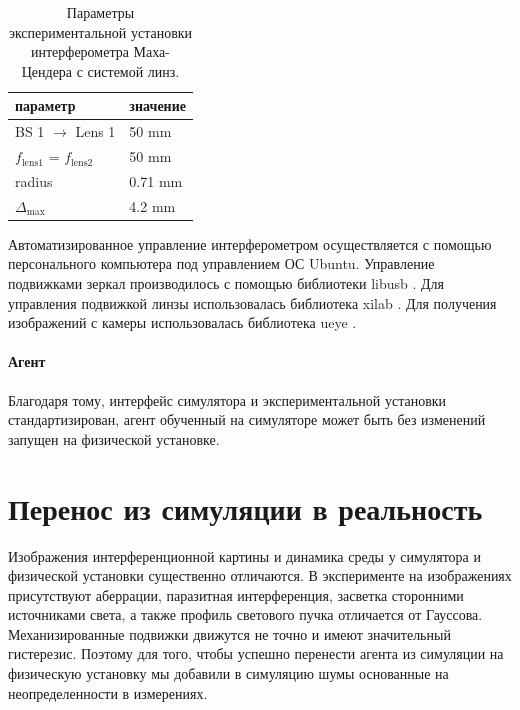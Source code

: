 \begin{table} [htbp]
    \centering
    \begin{threeparttable}
        \caption{Параметры экспериментальной установки интерферометра Маха-Цендера с системой линз.}\label{tab:MZI_lens_params}
        \begin{tabular}{| p{5cm} || p{5cm} |}
            \hline
            \hline
            параметр & значение \\
            \hline
            BS 1 $\to$ Lens 1 & 50 mm\\
            $f_{\mathrm{lens 1}}$ = $f_{\mathrm{lens 2}}$ & 50 mm\\
            radius & 0.71 mm\\
            $\Delta_{\mathrm{max}}$ & 4.2 mm\\
            \hline
            \hline
        \end{tabular}
    \end{threeparttable}
\end{table}

Автоматизированное управление интерферометром осуществляется с помощью персонального компьютера под управлением ОС Ubuntu. Управление подвижками зеркал производилось с помощью библиотеки libusb \cite{libusb}. Для управления подвижкой линзы использовалась библиотека xilab \cite{standa_soft}. Для получения изображений с камеры использовалась библиотека ueye \cite{ids_soft}. 


\paragraph{Агент}

Благодаря тому, интерфейс симулятора и экспериментальной установки стандартизирован, агент обученный на симуляторе может быть без изменений запущен на физической установке. 


\section{Перенос из симуляции в реальность}\label{sec:ch2/sec6}

Изображения интерференционной картины и динамика среды у симулятора и физической установки существенно отличаются. В эксперименте на изображениях присутствуют аберрации, паразитная интерференция, засветка сторонними источниками света, а также профиль светового пучка отличается от Гауссова. Механизированные подвижки движутся не точно и имеют значительный гистерезис. Поэтому для того, чтобы успешно перенести агента из симуляции на физическую установку  мы добавили в симуляцию шумы основанные на неопределенности в измерениях.

